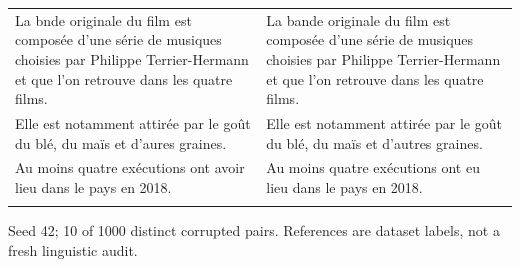 \documentclass[10pt]{article}
\begin{document}
{\begin{tabular}{@{}>{\raggedright\arraybackslash}p{}@{\hspace{0.04\textwidth}}>{\raggedright\arraybackslash}p{}@{}}
La bnde originale du film est composée d'une série de musiques choisies par Philippe Terrier-Hermann et que l'on retrouve dans les quatre films. & La bande originale du film est composée d'une série de musiques choisies par Philippe Terrier-Hermann et que l'on retrouve dans les quatre films. \\ \addlinespace[5pt]
Elle est notamment attirée par le goût du blé, du maïs et d'aures graines. & Elle est notamment attirée par le goût du blé, du maïs et d'autres graines. \\ \addlinespace[5pt]
Au moins quatre exécutions ont avoir lieu dans le pays en 2018. & Au moins quatre exécutions ont eu lieu dans le pays en 2018. \\ \addlinespace[5pt]
\bottomrule\end{tabular}}%
\ifdim\dimexpr\ht\pairtable+\dp\pairtable\relax>0.82\textheight%
\resizebox*{!}{0.82\textheight}{\usebox{\pairtable}}%
\else\usebox{\pairtable}\fi%
\par\smallskip\footnotesize Seed 42; 10 of 1000 distinct corrupted pairs. References are dataset labels, not a fresh linguistic audit.\normalsize
\clearpage
\end{document}
